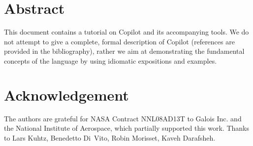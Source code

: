 \documentclass[12pt]{article}
\theoremstyle{example}
\begin{document}
\vspace{0.25cm}

\section*{Abstract}

{
\small
This document contains a tutorial on Copilot and its accompanying tools.
We do not attempt to give a complete, formal description of Copilot
(references are provided in the bibliography), rather we aim at
demonstrating the fundamental concepts of the language by using idiomatic
expositions and examples.
}
\newpage
{
\small
\setcounter{tocdepth}{2}
\tableofcontents
}

\newpage
{}
\section*{Acknowledgement}

The authors are grateful for NASA Contract NNL08AD13T to Galois Inc. and the
National Institute of Aerospace, which partially supported this work.
Thanks to Lars Kuhtz, Benedetto Di~Vito,  Robin Morisset, Kaveh
Darafsheh.

{










}
\end{document}
